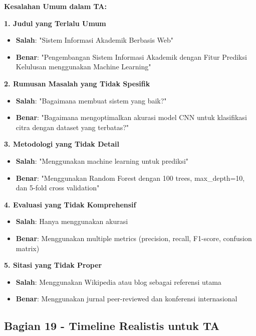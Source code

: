 \textbf{Kesalahan Umum dalam TA:}

\textbf{1. Judul yang Terlalu Umum}
\begin{itemize}
    \item \textbf{Salah}: "Sistem Informasi Akademik Berbasis Web"
    \item \textbf{Benar}: "Pengembangan Sistem Informasi Akademik dengan Fitur Prediksi Kelulusan menggunakan Machine Learning"
\end{itemize}

\textbf{2. Rumusan Masalah yang Tidak Spesifik}
\begin{itemize}
    \item \textbf{Salah}: "Bagaimana membuat sistem yang baik?"
    \item \textbf{Benar}: "Bagaimana mengoptimalkan akurasi model CNN untuk klasifikasi citra dengan dataset yang terbatas?"
\end{itemize}

\textbf{3. Metodologi yang Tidak Detail}
\begin{itemize}
    \item \textbf{Salah}: "Menggunakan machine learning untuk prediksi"
    \item \textbf{Benar}: "Menggunakan Random Forest dengan 100 trees, max\_depth=10, dan 5-fold cross validation"
\end{itemize}

\textbf{4. Evaluasi yang Tidak Komprehensif}
\begin{itemize}
    \item \textbf{Salah}: Hanya menggunakan akurasi
    \item \textbf{Benar}: Menggunakan multiple metrics (precision, recall, F1-score, confusion matrix)
\end{itemize}

\textbf{5. Sitasi yang Tidak Proper}
\begin{itemize}
    \item \textbf{Salah}: Menggunakan Wikipedia atau blog sebagai referensi utama
    \item \textbf{Benar}: Menggunakan jurnal peer-reviewed dan konferensi internasional
\end{itemize}

\subsection*{Bagian 19 - Timeline Realistis untuk TA}

